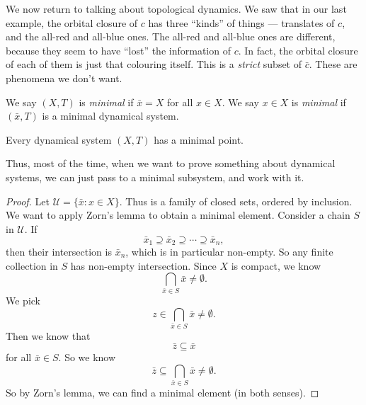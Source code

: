 \documentclass[a4paper]{article}
\begin{document}
We now return to talking about topological dynamics. We saw that in our last example, the orbital closure of $c$ has three ``kinds'' of things --- translates of $c$, and the all-red and all-blue ones. The all-red and all-blue ones are different, because they seem to have ``lost'' the information of $c$. In fact, the orbital closure of each of them is just that colouring itself. This is a \emph{strict} subset of $\bar{c}$. These are phenomena we don't want.
\begin{defi}
  We say $(X, T)$ is \emph{minimal} if $\bar{x} = X$ for all $x \in X$. We say $x \in X$ is \emph{minimal} if $(\bar{x}, T)$ is a minimal dynamical system.
\end{defi}

\begin{prop}
  Every dynamical system $(X, T)$ has a minimal point.
\end{prop}
Thus, most of the time, when we want to prove something about dynamical systems, we can just pass to a minimal subsystem, and work with it.

\begin{proof}
  Let $\mathcal{U} = \{\bar{x}: x \in X\}$. Thus is a family of closed sets, ordered by inclusion. We want to apply Zorn's lemma to obtain a minimal element. Consider a chain $S$ in $\mathcal{U}$. If
  \[
    \bar{x}_1 \supseteq \bar{x}_2 \supseteq \cdots \supseteq \bar{x}_n,
  \]
  then their intersection is $\bar{x}_n$, which is in particular non-empty. So any finite collection in $S$ has non-empty intersection. Since $X$ is compact, we know
  \[
    \bigcap_{\bar{x} \in S} \bar{x} \not= \emptyset.
  \]
  We pick
  \[
    z \in \bigcap_{\bar{x} \in S} \bar{x} \not= \emptyset.
  \]
  Then we know that
  \[
    \bar{z} \subseteq \bar{x}
  \]
  for all $\bar{x} \in S$. So we know
  \[
    \bar{z} \subseteq \bigcap_{\bar{x} \in S} \bar{x} \not= \emptyset.
  \]
  So by Zorn's lemma, we can find a minimal element (in both senses).
\end{proof}
\end{document}

